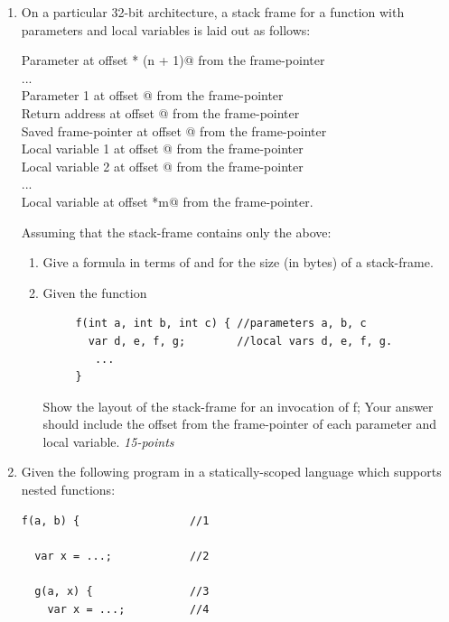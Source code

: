 \documentclass[12pt]{article}
\begin{document}
\begin{enumerate}

\item On a particular 32-bit architecture, a stack frame for a
  function with \verb@n@ parameters and \verb@m@ local variables is laid
  out as follows:

  Parameter \verb@n@ at offset  * (n + 1)@ from the frame-pointer\\
  ...\\
  Parameter 1 at offset @ from the frame-pointer\\
  Return address at offset @ from the frame-pointer\\
  Saved frame-pointer at offset @ from the frame-pointer\\
  Local variable 1 at offset @ from the frame-pointer\\
  Local variable 2 at offset @ from the frame-pointer\\
  ...\\
  Local variable \verb@m@ at offset *m@ from the frame-pointer.

  Assuming that the stack-frame contains only the above:

  \begin{enumerate}
  \item Give a formula in terms of \verb@n@ and \verb@m@ for the size
    (in bytes) of a stack-frame.

  \item Given the function

\begin{verbatim}
     f(int a, int b, int c) { //parameters a, b, c
       var d, e, f, g;        //local vars d, e, f, g.
        ...
     }
  \end{verbatim}
     Show the layout of the stack-frame for an invocation of f; Your
 answer should include the offset from the frame-pointer of each parameter
and local variable. \hfill{\textit{15-points}}


    \end{enumerate}

\item Given the following program in a statically-scoped language
 which supports nested functions:

\begin{verbatim}
f(a, b) {                 //1

  var x = ...;            //2

  g(a, x) {               //3
    var x = ...;          //4


\end{verbatim}
\end{enumerate}
\end{document}
